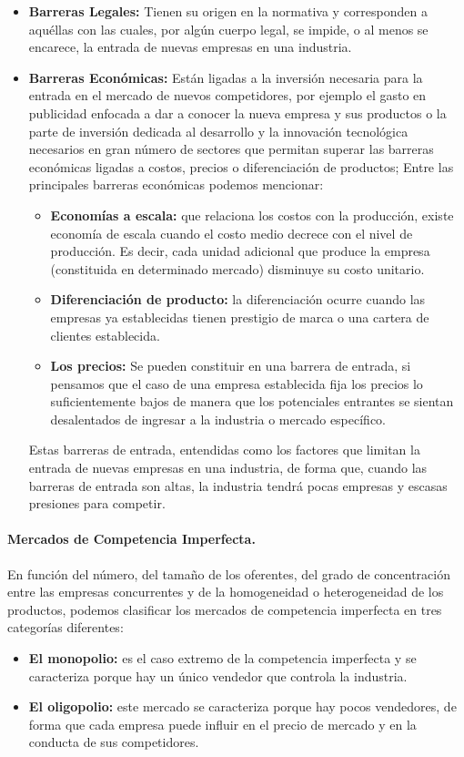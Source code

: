 \begin{itemize}
	\item \textbf{Barreras Legales:} Tienen su origen en la normativa y corresponden a aquéllas con las cuales, por algún cuerpo legal, se impide, o al menos se encarece, la entrada de nuevas empresas en una industria.
	\item \textbf{Barreras Económicas:} Están ligadas a la inversión necesaria para la entrada en el mercado de nuevos competidores, por ejemplo el gasto en publicidad enfocada a dar a conocer la nueva empresa y sus productos o la parte de inversión dedicada al desarrollo y la innovación tecnológica necesarios en gran número de sectores que permitan superar las barreras económicas ligadas a costos, precios o diferenciación de productos; Entre las principales barreras económicas podemos mencionar:
	\begin{itemize}
		\item \textbf{Economías a escala:} que relaciona los costos con la producción, existe economía de escala cuando el costo medio decrece con el nivel de producción. Es decir, cada unidad adicional que produce la empresa (constituida en determinado mercado) disminuye su costo unitario. 
		\item \textbf{Diferenciación de producto:} la diferenciación ocurre cuando las empresas ya establecidas tienen prestigio de marca o una cartera de clientes establecida.
		\item \textbf{Los precios:} Se pueden constituir en una barrera de entrada, si pensamos que 
		el caso de 	una empresa establecida fija los precios lo suficientemente bajos de manera que los potenciales entrantes
		se sientan desalentados de ingresar a la industria o mercado específico.
	\end{itemize}

Estas barreras de entrada, entendidas como los factores que limitan la entrada de nuevas empresas en una industria, de forma que, cuando las barreras de entrada son altas, la industria tendrá pocas empresas y escasas presiones para competir.  

\end{itemize}

\paragraph{{\normalsize Mercados de Competencia Imperfecta.}}
En función del número, del tamaño de los oferentes, del grado de concentración entre las empresas concurrentes y de la homogeneidad o heterogeneidad de los productos, podemos clasificar  los mercados de competencia imperfecta en tres categorías diferentes:
\begin{itemize}
	\item \textbf{El monopolio:} es el caso extremo de la competencia	imperfecta y se caracteriza porque hay un único vendedor
	que controla la industria.
	\item \textbf{El oligopolio:} este mercado se caracteriza porque hay pocos vendedores, de forma que cada empresa 
	puede influir en el precio de mercado y en la conducta 	de sus competidores.\\
\end{itemize}


